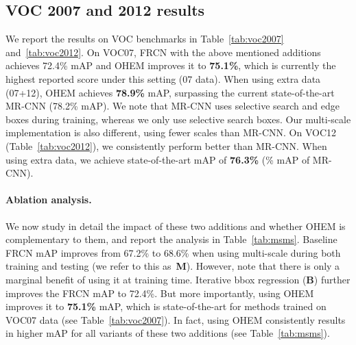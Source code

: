 \documentclass[10pt,twocolumn,letterpaper]{article}
\begin{document}
\subsection{VOC 2007 and 2012 results}
We report the results on VOC benchmarks in Table~\ref{tab:voc2007} and~\ref{tab:voc2012}. On VOC07, FRCN with the above mentioned additions achieves 72.4\% mAP and OHEM improves it to \textbf{75.1\%}, which is currently the highest reported score under this setting (07 data). When using extra data (07+12), OHEM achieves \textbf{78.9\%} mAP, surpassing the current state-of-the-art MR-CNN (78.2\% mAP). 
We note that MR-CNN uses selective search and edge boxes during training, whereas we only use selective search boxes. Our multi-scale implementation is also different, using fewer scales than MR-CNN. On VOC12 (Table~\ref{tab:voc2012}), we consistently perform better than MR-CNN. When using extra data, we achieve state-of-the-art mAP of {\bf 76.3\%} (\% mAP of MR-CNN).

\vspace{-0.07in}
\paragraph{Ablation analysis.} We now study in detail the impact of these two additions and whether OHEM is complementary to them, and report the analysis in Table~\ref{tab:msms}. Baseline FRCN mAP improves from 67.2\% to 68.6\% when using multi-scale during both training and testing (we refer to this as~\textbf{M}). However, note that there is only a marginal benefit of using it at training time. Iterative bbox regression (\textbf{B}) further improves the FRCN mAP to 72.4\%. But more importantly, using OHEM improves it to \textbf{75.1\%} mAP, which is state-of-the-art for methods trained on VOC07 data (see Table~\ref{tab:voc2007}). In fact, using OHEM consistently results in higher mAP for all variants of these two additions (see Table~\ref{tab:msms}).
\end{document}
